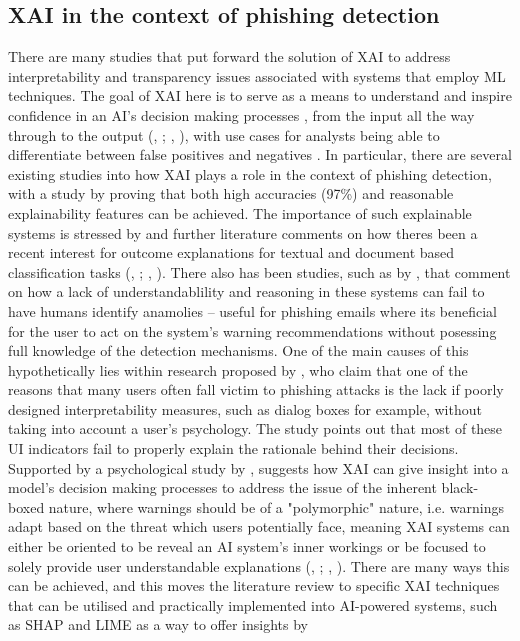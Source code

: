 
\subsection*{XAI in the context of phishing detection}
There are many studies that put forward the solution of XAI to address interpretability and transparency issues \citep{roshan2022using} associated with systems that employ ML techniques. The goal of XAI here is to serve as a means to understand and inspire confidence in an AI's decision making processes \citep{khanom2025pd_ebm}, from the input all the way through to the output (\citeauthor{jawale2020jeevn}, \citeyear{jawale2020jeevn}; \citeauthor{sanchez2022phishing}, \citeyear{sanchez2022phishing}), with use cases for analysts being able to differentiate between false positives and negatives \citep{van2024applicability}. In particular, there are several existing studies into how XAI plays a role in the context of phishing detection, with a study by \cite{alzahrani2024explainable} proving that both high accuracies (97\%) and reasonable explainability features can be achieved. The importance of such explainable systems is stressed by \cite{shendkar2024enhancing} and further literature comments on how theres been a recent interest for outcome explanations for textual and document based classification tasks (\citeauthor{martens2014explaining}, \citeyear{martens2014explaining}; \citeauthor{lei2016rationalizing}, \citeyear{lei2016rationalizing}). There also has been studies, such as by \cite{vo2024securing}, that comment on how a lack of understandablility and reasoning in these systems can fail to have humans identify anamolies -- useful for phishing emails where its beneficial for the user to act on the system's warning recommendations without posessing full knowledge of the detection mechanisms. One of the main causes of this hypothetically lies within research proposed by \cite{greco2023explaining}, who claim that one of the reasons that many users often fall victim to phishing attacks is the lack if poorly designed interpretability measures, such as dialog boxes for example, without taking into account a user's psychology. The study points out that most of these UI indicators fail to properly explain the rationale behind their decisions. Supported by a psychological study by \cite{anderson2015polymorphic}, suggests how XAI can give insight into a model's decision making processes to address the issue of the inherent black-boxed nature, where warnings should be of a "polymorphic" nature, i.e. warnings adapt based on the threat which users potentially face, meaning XAI systems can either be oriented to be reveal an AI system's inner workings or be focused to solely provide user understandable explanations (\citeauthor{lipton2018mythos}, \citeyear{lipton2018mythos}; \citeauthor{ribeiro2016model}, \citeyear{ribeiro2016model}). There are many ways this can be achieved, and this moves the literature review to specific XAI techniques that can be utilised and practically implemented into AI-powered systems, such as SHAP and LIME as a way to offer insights \citep{shendkar2024enhancing} by 